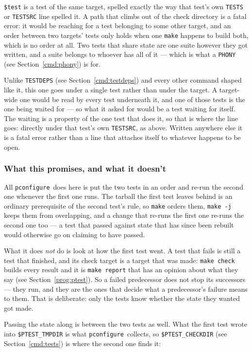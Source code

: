 \documentclass{article}
\newcommand{\pconfigure}{\texttt{pconfigure}}
\begin{document}
\texttt{\$test} is a test of the same target, spelled exactly the way
that test's own \texttt{TESTS} or \texttt{TESTSRC} line spelled it.  A
path that climbs out of the check directory is a fatal error: it would
be reaching for a test belonging to some other target, and an order
between two targets' tests only holds when one \texttt{make} happens to
build both, which is no order at all.  Two tests that share state are
one suite however they got written, and a suite belongs to whoever has
all of it --- which is what a \texttt{PHONY} (see
Section~\ref{cmd:phony}) is for.

Unlike \texttt{TESTDEPS} (see Section~\ref{cmd:testdeps}) and every
other command shaped like it, this one goes under a single test rather
than under the target.  A target-wide one would be read by every test
underneath it, and one of those tests is the one being waited for ---
so what it asked for would be a test waiting for itself.  The waiting
is a property of the one test that does it, so that is where the line
goes: directly under that test's own \texttt{TESTSRC}, as above.
Written anywhere else it is a fatal error rather than a line that
attaches itself to whatever happens to be open.

\subsubsection{What this promises, and what it doesn't}

All \pconfigure\ does here is put the two tests in an order and re-run
the second one whenever the first one runs.  The tarball the first
test leaves behind is an ordinary prerequisite of the second test's
rule, so \texttt{make} orders them, \texttt{make -j} keeps them from
overlapping, and a change that re-runs the first one re-runs the
second one too --- a test that passed against state that has since
been rebuilt would otherwise go on claiming to have passed.

What it does \textit{not} do is look at how the first test went.  A
test that fails is still a test that finished, and its check target is
a target that was made: \texttt{make check} builds every result and it
is \texttt{make report} that has an opinion about what they say (see
Section~\ref{prog:ptest}).  So a failed predecessor does not stop its
successors --- they run, and they are the ones that decide what a
predecessor's failure means to them.  That is deliberate: only the
tests know whether the state they wanted got made.

Passing the state along is between the two tests as well.  What the
first test wrote into \texttt{\$PTEST\_TMPDIR} is what \pconfigure\
collects, so \texttt{\$PTEST\_CHECKDIR} (see Section~\ref{cmd:tests})
is where the second one finds it:
\end{document}
